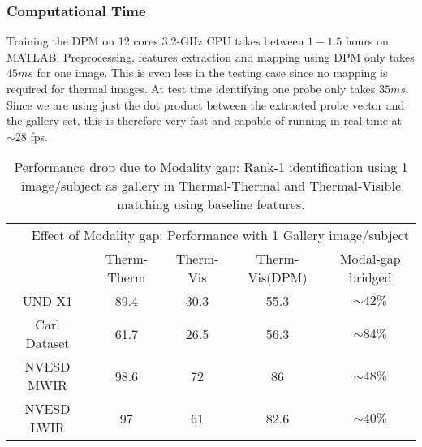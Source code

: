 \documentclass[smallextended,natbib]{svjour3}       \usepackage{graphicx}
\begin{document}
\subsubsection{Computational Time}
Training the DPM on 12 cores 3.2-GHz CPU takes between $1-1.5$ hours on MATLAB. Preprocessing, features extraction and mapping using DPM only takes $45 ms$ for one image. This is even less in the testing case since no mapping is required for thermal images. At test time identifying one probe only takes $35 ms$. Since we are using just the dot product between the extracted probe vector and the gallery set, this is therefore very fast and capable of running in real-time at $\sim 28$ fps.

\begin{table}[t]
\centering
\begin{tabular}{@{}ccccc@{}}
\toprule
\multicolumn{5}{r}{Effect of Modality gap: Performance with 1 Gallery image/subject} \\ \cmidrule(l){2-5}
&Therm-Therm   & Therm-Vis  & Therm-Vis(DPM)  & Modal-gap bridged  \\ 
\midrule
 UND-X1 		&89.4             & 30.3            & 55.3                       & $\sim 42 \%$               \\
 Carl Dataset 	&61.7             & 26.5            & 56.3                       & $\sim 84 \%$               \\
NVESD MWIR 	&98.6             & 72            & 86                       & $\sim 48 \%$               \\
NVESD LWIR 	&97             & 61            & 82.6                       & $\sim 40 \%$                
\end{tabular}
\caption{Performance drop due to Modality gap: Rank-1 identification using 1 image/subject as gallery in Thermal-Thermal and Thermal-Visible matching using baseline features.}

\label{table:modgap}
\end{table}
\end{document}
